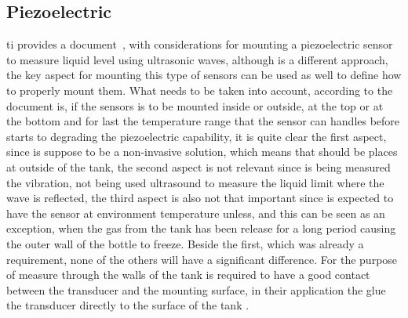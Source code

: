 \subsection{Piezoelectric}
 \acrshort{ti} provides a document~\cite{minasiHowSelectMount2015}, with considerations for mounting a piezoelectric sensor to measure liquid level using ultrasonic waves, although is a different approach, the key aspect for mounting this type of sensors can be used as well to define how to properly mount them. What needs to be taken into account, according to the document is, if the sensors is to be mounted inside or outside, at the top or at the bottom and for last the temperature range that the sensor can handles before starts to degrading the piezoelectric capability, it is quite clear the first aspect, since is suppose to be a non-invasive solution, which means that should be places at outside of the tank, the second aspect is not relevant since is being measured the vibration, not being used ultrasound to measure the liquid limit where the wave is reflected, the third aspect is also not that important since is expected to have the sensor at environment temperature unless, and this can be seen as an exception, when the gas from the tank has been release for a long period causing the outer wall of the bottle to freeze. Beside the first, which was already a requirement, none of the others will have a significant difference. For the purpose of measure through the walls of the tank is required to have a good contact between the transducer and the mounting surface, in their application the glue the transducer directly to the surface of the tank \cite{minasiHowSelectMount2015}.

